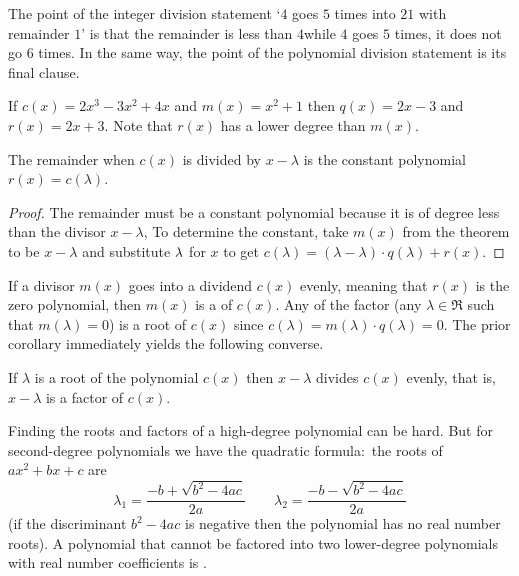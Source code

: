 The point of the integer division statement
`\( 4 \) goes \( 5 \) times into \( 21 \) with remainder \( 1 \)'
is that the remainder is less than \( 4 \)\Dash while \( 4 \) goes \( 5 \)
times, it does not go \( 6 \) times.
In the same way, the point of the polynomial division statement
is its final clause.

\begin{example}
If \( c(x)=2x^3-3x^2+4x \) and \( m(x)=x^2+1 \) then \( q(x)=2x-3 \) and
\( r(x)=2x+3 \).
Note that \( r(x) \) has a lower degree than \( m(x) \).
\end{example}

\begin{corollary}
The remainder when \( c(x) \) is divided by \( x-\lambda \) is the constant
polynomial \( r(x)=c(\lambda) \).
\end{corollary}

\begin{proof}
The remainder must be a constant polynomial
because it is of degree less than the divisor \( x-\lambda \), 
To determine the constant,
take $m(x)$ from the theorem to be $x-\lambda$ and 
substitute \( \lambda\/ \) for $x$ to get
\( c(\lambda)=(\lambda-\lambda)\cdot q(\lambda)+r(x) \). 
\end{proof}

If a divisor \( m(x) \) goes into a dividend \( c(x) \) evenly,
meaning that \( r(x) \) is the zero polynomial,
then \( m(x) \) is a  of \( c(x) \).
Any  of the factor (any \( \lambda\in\Re \) such that
\( m(\lambda)=0 \)) is a root of \( c(x) \) since
\( c(\lambda)=m(\lambda)\cdot q(\lambda)=0 \).
The prior corollary immediately yields the following converse.

\begin{corollary}
If \( \lambda \) is a root of the polynomial \( c(x) \)
then \( x-\lambda \) divides \( c(x) \) evenly, that is, 
$x-\lambda$ is a factor of $c(x)$.
\end{corollary}

Finding the roots and factors of a high-degree polynomial can be hard.
But for second-degree polynomials we have the quadratic formula:~the
roots of \( ax^2+bx+c \) are
\begin{equation*}
   \lambda_1=\frac{-b+\sqrt{b^2-4ac}}{2a}
   \qquad
   \lambda_2=\frac{-b-\sqrt{b^2-4ac}}{2a}
\end{equation*}
(if the discriminant \( b^2-4ac \) is negative then the polynomial
has no real number roots).
A polynomial that cannot be factored into two lower-degree polynomials
with real number coefficients is .

